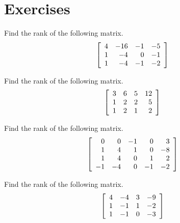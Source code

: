 \section*{Exercises}

\begin{enumialphparenastyle}

\begin{ex} Find the rank of the following matrix.
\begin{equation*}
\left[
\begin{array}{rrrr}
4 & -16 & -1 & -5 \\
1 & -4 & 0 & -1 \\
1 & -4 & -1 & -2
\end{array}
\right]
\end{equation*}
\end{ex}

\begin{ex} Find the rank of the following matrix.
\begin{equation*}
\left[
\begin{array}{rrrr}
3 & 6 & 5 & 12 \\
1 & 2 & 2 & 5 \\
1 & 2 & 1 & 2
\end{array}
\right]
\end{equation*}
\end{ex}

\begin{ex} Find the rank of the following matrix.
\begin{equation*}
\left[
\begin{array}{rrrrr}
0 & 0 & -1 & 0 & 3 \\
1 & 4 & 1 & 0 & -8 \\
1 & 4 & 0 & 1 & 2 \\
-1 & -4 & 0 & -1 & -2
\end{array}
\right]
\end{equation*}
\end{ex}

\begin{ex} Find the rank of the following matrix.
\begin{equation*}
\left[
\begin{array}{rrrr}
4 & -4 & 3 & -9 \\
1 & -1 & 1 & -2 \\
1 & -1 & 0 & -3
\end{array}
\right]
\end{equation*}
\end{ex}


\end{enumialphparenastyle}

